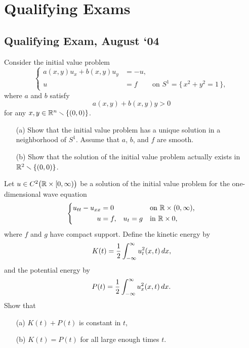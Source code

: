 \section{Qualifying Exams}
\subsection{Qualifying Exam, August `04}
\begin{problem}
  Consider the initial value problem
  \[
    \left\{
      \begin{aligned}
        a(x,y)u_x+b(x,y)u_y&=-u,\\
        u&=f&\text{on \(S^1=\bigl\{\,x^2+y^2=1\,\bigr\}\)},
      \end{aligned}
    \right.
  \]
  where \(a\) and \(b\) satisfy
  \[
    a(x,y)+b(x,y)y>0
  \]
  for any \(x,y\in\mathbb{R}^n\smallsetminus\{(0,0)\}\).
  \begin{itemize}[noitemsep]
  \item[(a)] Show that the initial value problem has a unique solution in a
    neighborhood of \(S^1\). Assume that \(a\), \(b\), and \(f\) are
    smooth.
  \item[(b)] Show that the solution of the initial value problem actually
    exists in \(\mathbb{R}^2\smallsetminus\{(0,0)\}\).
  \end{itemize}
\end{problem}
\begin{solution*}
\end{solution*}

\begin{problem}
  Let \(u\in C^2\bigl(\mathbb{R}\times[0,\infty)\bigr)\) be a solution of the
  initial value problem for the one-dimensional wave equation
  \[
    \left\{
      \begin{aligned}
        u_{tt}-u_{xx}&=0&&&&\text{on \(\mathbb{R}\times(0,\infty)\),}\\
        u&=f,&u_t&=g&&\text{in \(\mathbb{R}\times 0\),}
      \end{aligned}
    \right.
  \]
  where \(f\) and \(g\) have compact support. Define the kinetic energy by
  \[
    K(t)=\frac{1}{2}\int_{-\infty}^\infty u_t^2(x,t)\mathop{}\!d x,
  \]
  and the potential energy by
  \[
    P(t)=\frac{1}{2}\int_{-\infty}^\infty u_x^2(x,t)\mathop{}\!d x.
  \]
  Show that
  \begin{itemize}[noitemsep]
  \item[(a)] \(K(t)+P(t)\) is constant in \(t\),
  \item[(b)] \(K(t)=P(t)\) for all large enough times \(t\).
  \end{itemize}
\end{problem}
\begin{solution*}
\end{solution*}


